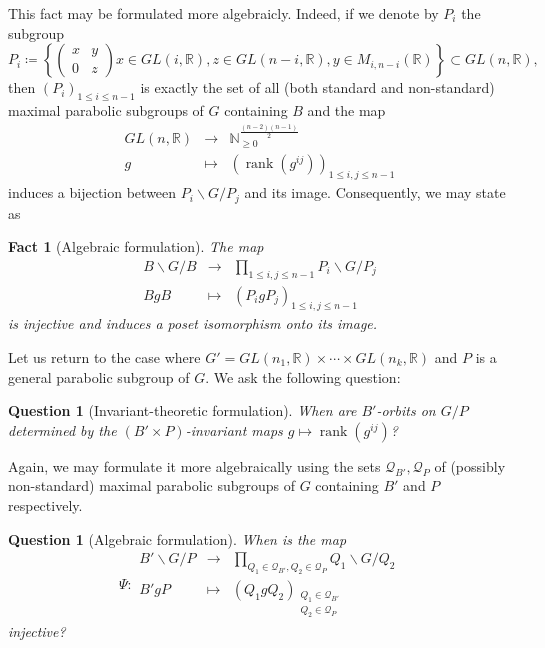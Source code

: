\documentclass[pdftex]{sigma}
\numberwithin{equation}{section}
\theoremstyle{definition}
\newcommand{\rank}{\operatorname{rank}}
\newcommand{\R}{\mathbb{R}}
\newcommand{\N}{\mathbb{N}}
\newcounter{countfactD}
\newcounter{countfactDD}
\newcounter{countquestionD}
\theoremstyle{plain}
\newtheorem{question}{Question}
\newtheorem{questionD}[countquestionD]{Question}
\theoremstyle{plain}
\newtheorem{factDD}[countfactDD]{Fact}
\theoremstyle{plain}
\theoremstyle{plain}
\begin{document}
This fact may be formulated more algebraicly. Indeed, if we denote by $P_i$ the subgroup
\begin{equation*}
	P_i \coloneq \left\{\begin{pmatrix}
x & y \\
0 & z
\end{pmatrix}x \in GL(i,\R), z \in GL(n-i,\R), y \in M_{i,n-i}(\R)\right\} \subset GL(n,\R),
\end{equation*}
then $(P_i)_{1 \leqslant i \leqslant n-1}$ is exactly the set of all (both standard and non-standard) maximal parabolic subgroups of $G$ containing $B$ and the map
\begin{equation*}
	\begin{array}{ccc}
	GL(n,\R) & \to & \N_{\geqslant 0}^{\frac{(n-2)(n-1)}{2}} \\
	g & \mapsto & (\rank(g^{ij}))_{1 \leqslant i,j \leqslant n-1}
\end{array}
\end{equation*}
induces a bijection between $P_i\backslash G/P_j$ and its image. Consequently, we may state  as 
\begin{factDD}[Algebraic formulation]
	The map 
	\begin{equation*}
		\begin{array}{ccc}
	B\backslash G/B & \to & \displaystyle \prod_{1 \leqslant i,j \leqslant n-1}P_i \backslash G/P_j \\
	BgB & \mapsto & (P_igP_j)_{1 \leqslant i,j \leqslant n-1}
\end{array}
	\end{equation*}
	is injective and induces a poset isomorphism onto its image.
\end{factDD}

Let us return to the case where $G'= GL(n_1,\R) \times \cdots \times GL(n_k,\R)$ and $P$ is a general parabolic subgroup of $G$. We ask the following question:
\setcounter{question}{1}
\begin{question}[Invariant-theoretic formulation]\label{Question 2}
	When are $B'$-orbits on $G/P$ determined by the $(B' \times P)$-invariant maps $g \mapsto \rank(g^{ij})$?
\end{question}
Again, we may formulate it more algebraically using the sets $\mathcal Q_{B'}, \mathcal Q_{P}$ of (possibly non-standard) maximal parabolic subgroups of $G$ containing $B'$ and $P$ respectively.
\setcounter{countquestionD}{1}
\begin{questionD}[Algebraic formulation]
	When is the map 
	\begin{equation*}
		\Psi : \begin{array}{ccc}
		B' \backslash G/P & \to & \displaystyle \prod_{Q_1 \in \mathcal Q_{B'}, Q_2 \in \mathcal Q_{P}} Q_1 \backslash G/Q_2 \\
		B'gP & \mapsto & (Q_1gQ_2)_{\substack{Q_1 \in \mathcal Q_{B'} \\ Q_2 \in \mathcal Q_{P}}}
	\end{array}
	\end{equation*}
	injective?
\end{questionD}
\end{document}
